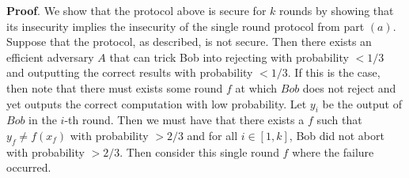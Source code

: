 \documentclass{article}
\begin{document}
\begin{enumerate}[noitemsep,topsep=\mdcompacttopsep,label=\alph*.]
\begin{mdbmarginx}{1ex}{0pt}{1ex}{0pt}%
\noindent{}\textbf{Proof}.  We show that the protocol above is secure for $k$ rounds by showing that its insecurity implies the 
insecurity of the single round protocol from part $(a)$. Suppose that the protocol, as described,
is not secure. Then there exists an efficient adversary $A$ that can trick Bob into rejecting 
with probability $<1/3$ and outputting the correct results with probability $<1/3$. If this is the case, then note 
that there must exists some round $f$ at which $Bob$ does not reject and yet outputs the correct 
computation with low probability. Let $y_i$ be the output of $Bob$ in the $i$-th round. 
Then we must have
that there exists a $f$ such that $y_f \neq f(x_f)$ with probability $> 2/3$ and for all $i \in [1,k]$, 
Bob did not abort with probability $> 2/3$. Then consider this single round $f$ where the failure occurred.%


\end{mdbmarginx}
\end{enumerate}
\end{document}
